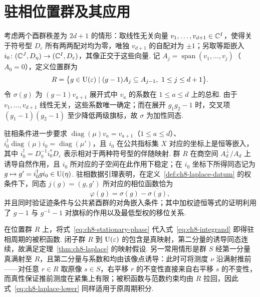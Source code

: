 \section{驻相位置群及其应用}
\label{sec:ch8-stationary-position}

考虑两个酉群秩差为 $2d+1$ 的情形：取线性无关向量 $v_1,\ldots,v_{d+1}\in\mathbb{C}^I$，使得关于符号型 $D_\varepsilon$ 所有两两配对均为零，唯独 $v_{d+1}$ 的自配对为 $\pm1$；另取等距嵌入 $i_0\colon(\mathbb{C}^J,D_\eta)\to(\mathbb{C}^I,D_\varepsilon)$，其像正交于这些向量. 记 $A_j=\operatorname{span}(v_1,\ldots,v_j)$（$A_0=0$），定义位置群为
\[
 R=\bigl\{g\in \operatorname{U}(\varepsilon)\mid (g-1)A_j\subseteq A_{j-1},\
                   1\le j\le d+1\bigr\}.
\]
令 $\sigma(g)$ 为 $(g-1)v_{a+1}$ 展开式中 $v_a$ 的系数在 $1\le a\le d$ 上的总和. 由于 $v_1,\ldots,v_{d+1}$ 线性无关，这些系数唯一确定；而在展开 $g_1g_2-1$ 时，交叉项 $(g_1-1)(g_2-1)$ 至少降低两级旗标，故 $\sigma$ 为加性同态.

驻相条件进一步要求 $\operatorname{diag}(\mu)v_a=v_{a+1}$（$1\le a\le d$）、$i_0^\dagger\operatorname{diag}(\mu)i_0=\operatorname{diag}(\mu')$，且 $i_0$ 在公共指标集 $X$ 对应的坐标上是恒等嵌入，其中 $i_0^\dagger=D_\eta^{-1}i_0^*D_\varepsilon$ 表示相对于两种符号型的伴随映射. 群 $R$ 在商空间 $A_d^\perp/A_d$ 上诱导自然作用，且 $i_0$ 所对应的子空间在此作用下稳定；在 $i_0$ 坐标下所得同态记为 $g\mapsto g'=i_0^\dagger g i_0\in \operatorname{U}(\eta)$. 驻相数据引理表明，在定义~\ref{def:ch8-laplace-datum} 的权条件下，同态 $j(g)=(g,g')$ 所对应的相位函数恰为
\begin{equation}
\label{eq:ch8-stationary-phase}
 \varphi(g)=\sigma(g)-\overline{\sigma(g)},
\end{equation}
并且同时验证迹条件与公共紧酉群的对角嵌入条件；其中加权迹恒等式的证明利用了 $g-1$ 与 $g^{-1}-1$ 对旗标的作用以及最低型权的移位关系.

\label{use:ch8-stationary-period}在位置群 $R$ 上，将式~\eqref{eq:ch8-stationary-phase} 代入式~\eqref{eq:ch8-integrand} 即得驻相周期的被积函数. 闭子群 $R$ 到 $\operatorname{U}(\varepsilon)$ 的包含是真映射，第二分量的诱导同态连续，故满足定理~\ref{thm:ch8-laplace} 的映射假设. 另一常用情形是群 $S$ 经第一分量真满射至 $R$，且第二分量与系数和均由该像点诱导：此时可将测度 $\nu$ 沿满射推前——对任意 $r\in R$ 取原像 $s\in S$，右平移 $r$ 的不变性直接来自右平移 $s$ 的不变性，而真性保证推前测度在紧集上有限；被积函数与范数约束均由 $R$ 拉回，因此式~\eqref{eq:ch8-laplace-lower} 同样适用于原周期积分.

